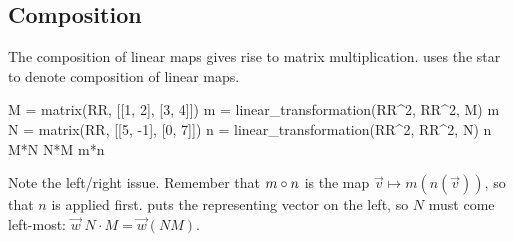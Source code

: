 \subsection{Composition}
The composition of linear maps gives rise to matrix multiplication.
\Sage{} uses the star \inlinecode{*} to denote composition of linear maps.
\begin{sageoutput}[s,6,68,62;s,7,70,62;s,14,68,62;s,15,70,62;s,26,68,62;s,27,70,62]
M = matrix(RR, [[1, 2], [3, 4]])
m = linear_transformation(RR^2, RR^2, M)
m
N = matrix(RR, [[5, -1], [0, 7]])
n = linear_transformation(RR^2, RR^2, N)
n
M*N
N*M
m*n
\end{sageoutput}
Note the left/right issue.
Remember that $m\mathbin{\circ} n$ is the map $\vec{v}\mapsto m(n(\vec{v}))$, 
so that $n$ is applied first. 
\Sage{} puts the representing vector on the left, so 
$N$ must come left-most: $\vec{w}\;N\cdot M=\vec{w}(NM)$.

\endinput


TODO:
